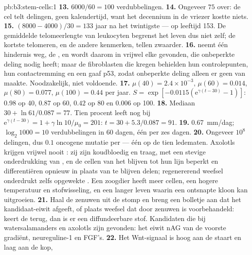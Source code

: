\begin{solution}{pb:b3:stem-cells:1}
\textbf{13.} $6000/60 = 100$ verdubbelingen.
\textbf{14.} Ongeveer $75$ over: de cel telt delingen, geen kalendertijd,
want het decennium in de vriezer kostte niets.
\textbf{15.} $(8000 - 4000)/30 = 133$ jaar na het twintigste --- op
leeftijd 153. De gemiddelde telomeerlengte van leukocyten begrenst het
leven dus niet zelf; de kortste telomeren, en de andere kenmerken,
tellen zwaarder.
\textbf{16.}  neemt één hindernis weg, de , en wordt daarom in vrijwel elke  gevonden, die
onbeperkte deling nodig heeft; maar de fibroblasten die 
kregen behielden hun controlepunten, hun contactremming en een gaaf
p53, zodat onbeperkte deling alleen er geen  van maakte.
Noodzakelijk, niet voldoende.
\textbf{17.} $\mu(40) = 2.4\times 10^{-3}$, $\mu(60) = 0.014$, $\mu(80) =
0.077$, $\mu(100) = 0.44$ per jaar. $S = \exp[-0.0115(\mathrm{e}^{\gamma
(t-30)} - 1)]$: $0.98$ op 40, $0.87$ op 60, $0.42$ op 80 en $0.006$ op
100.
\textbf{18.} Mediaan $30 + \ln 61/0.087 = 77$. Tien procent leeft nog
bij $\mathrm{e}^{\gamma(t-30)} = 1 + \gamma\ln 10/\mu_{0} = 201$: $t = 30 +
5.3/0.087 = 91$.
\textbf{19.} \qty{0.67}{mm/dag}; $\log_{2}1000 = 10$ verdubbelingen in
60 dagen, één per zes dagen.
\textbf{20.} Ongeveer $10^{8}$ delingen, dus $0.1$ oncogene mutatie per
 --- één op de tien ledematen. Axolotls krijgen vrijwel nooit
: zij zijn koudbloedig en traag, met een stevige onderdrukking
van , en de cellen van het  blijven tot hun lijn beperkt
en differentiëren opnieuw in plaats van te blijven delen; regenererend
weefsel onderdrukt zelfs opgewekte . Een zoogdier heeft meer
cellen, een hogere temperatuur en stofwisseling, en een langer leven
waarin een ontsnapte kloon kan uitgroeien.
\textbf{21.} Haal de zenuwen uit de stomp en breng een bolletje aan dat
het kandidaat-eiwit afgeeft, of plaats weefsel dat door zenuwen is
voorbehandeld: keert de  terug, dan is er een diffundeerbare
stof. Kandidaten die bij watersalamanders en axolotls zijn gevonden:
het eiwit nAG van de voorste gradiënt, neureguline-1 en FGF's.
\textbf{22.} Het Wnt-signaal is hoog aan de staart en laag aan de kop,

\end{solution}
